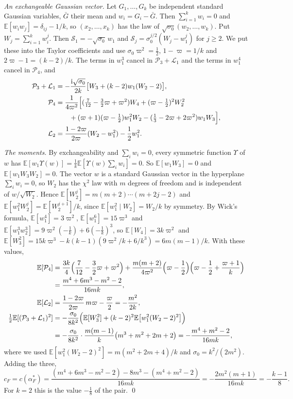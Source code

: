 \documentclass[EJP,preprint]{ejpecp}
\newcommand{\E}{\mathbb{E}}
\begin{document}
\emph{An exchangeable Gaussian vector.} Let $G_1,\dots,G_k$ be independent standard Gaussian
variables, $\bar G$ their mean and $w_i=G_i-\bar G$. Then $\sum_{i=1}^kw_i=0$ and
$\E[w_iw_j]=\delta_{ij}-1/k$, so $(x_2,\dots,x_k)$ has the law of
$\sqrt{\sigma_0}(w_2,\dots,w_k)$. Put $W_j=\sum_{i=1}^kw_i^j$. Then $\mathcal S_1=-\sqrt{\sigma_0}\,w_1$ and
$\mathcal S_j=\sigma_0^{j/2}(W_j-w_1^j)$ for $j\ge2$. We put these into the Taylor coefficients and use
$\sigma_0\varpi^2=\frac12$, $1-\varpi=1/k$ and $2\varpi-1=(k-2)/k$. The terms in $w_1^3$ cancel in
$\mathcal P_3+\mathcal L_1$ and the terms in $w_1^4$ cancel in $\mathcal P_4$, and
\begin{align*}
\mathcal P_3+\mathcal L_1&=-\frac{\mathrm i\sqrt{\sigma_0}}{2k}\bigl[W_3+(k-2)w_1(W_2-2)\bigr],\\
\mathcal P_4&=\frac1{4\varpi^2}\Bigl[(\tfrac7{12}-\tfrac32\varpi+\varpi^2)W_4+(\varpi-\tfrac12)^2W_2^2\\
&\qquad+(\varpi+1)(\varpi-\tfrac12)w_1^2W_2-(\tfrac13-2\varpi+2\varpi^2)w_1W_3\Bigr],\\
\mathcal L_2&=\frac{1-2\varpi}{2\varpi}(W_2-w_1^2)-\frac12w_1^2 .
\end{align*}

\emph{The moments.} By exchangeability and $\sum_iw_i=0$, every symmetric function $\Upsilon$ of
$w$ has $\E[w_1\Upsilon(w)]=\frac1k\E[\Upsilon(w)\sum_iw_i]=0$. So $\E[w_1W_3]=0$ and
$\E[w_1W_3W_2]=0$. The vector $w$ is a standard Gaussian vector in the hyperplane
$\sum_iw_i=0$, so $W_2$ has the $\chi^2$ law with $m$ degrees of freedom and is independent of
$w/\sqrt{W_2}$. Hence $\E[W_2^j]=m(m+2)\cdots(m+2j-2)$ and
$\E[w_1^2W_2^j]=\E[W_2^{j+1}]/k$, since $\E[w_1^2\mid W_2]=W_2/k$ by symmetry. By Wick's
formula, $\E[w_1^4]=3\varpi^2$, $\E[w_1^6]=15\varpi^3$ and
$\E[w_1^3w_2^3]=9\varpi^2(-\frac1k)+6(-\frac1k)^3$, so $\E[W_4]=3k\varpi^2$ and
$\E[W_3^2]=15k\varpi^3-k(k-1)(9\varpi^2/k+6/k^3)=6m(m-1)/k$. With these values,
\begin{align*}
\E[\mathcal P_4]&=\frac{3k}4\Bigl(\frac7{12}-\frac32\varpi+\varpi^2\Bigr)
+\frac{m(m+2)}{4\varpi^2}\Bigl(\varpi-\frac12\Bigr)\Bigl(\varpi-\frac12+\frac{\varpi+1}k\Bigr)\\
&=\frac{m^4+6m^3-m^2-2}{16mk},\\
\E[\mathcal L_2]&=\frac{1-2\varpi}{2\varpi}\,m\varpi-\frac\varpi2=-\frac{m^2}{2k},\\
\tfrac12\E[(\mathcal P_3+\mathcal L_1)^2]&=-\frac{\sigma_0}{8k^2}\Bigl(\E[W_3^2]+(k-2)^2\E\bigl[w_1^2(W_2-2)^2\bigr]\Bigr)\\
&=-\frac{\sigma_0}{8k^2}\cdot\frac{m(m-1)}k\bigl(m^3+m^2+2m+2\bigr)
=-\frac{m^4+m^2-2}{16mk},
\end{align*}
where we used $\E[w_1^2(W_2-2)^2]=m(m^2+2m+4)/k$ and $\sigma_0=k^2/(2m^2)$. Adding the three,
\[
c_F=c(\alpha^*_F)=\frac{(m^4+6m^3-m^2-2)-8m^3-(m^4+m^2-2)}{16mk}=-\frac{2m^2(m+1)}{16mk}
=-\frac{k-1}8 .
\]
For $k=2$ this is the value $-\frac18$ of the pair. \qed
\end{document}
